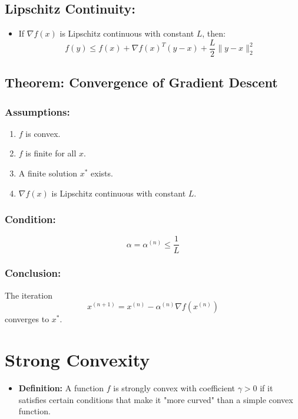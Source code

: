 \documentclass{article}
\begin{document}
\subsection*{Lipschitz Continuity:}
\begin{itemize}
    \item If $\nabla f(x)$ is Lipschitz continuous with constant $L$, then:
    \[
    f(y) \leq f(x) + \nabla f(x)^{T}(y - x) + \frac{L}{2}\|y - x\|^{2}_{2}
    \]
\end{itemize}

\subsection*{Theorem: Convergence of Gradient Descent}

\subsubsection*{Assumptions:}
\begin{enumerate}
    \item $f$ is convex.
    \item $f$ is finite for all $x$.
    \item A finite solution $x^{*}$ exists.
    \item $\nabla f(x)$ is Lipschitz continuous with constant $L$.
\end{enumerate}

\subsubsection*{Condition:}
\[
\alpha = \alpha^{(n)} \leq \frac{1}{L}
\]

\subsubsection*{Conclusion:} 
The iteration
\[
x^{(n+1)} = x^{(n)} - \alpha^{(n)} \nabla f(x^{(n)})
\]
converges to $x^{*}$.


\section*{Strong Convexity}
\begin{itemize}
    \item \textbf{Definition:} A function $f$ is strongly convex with coefficient $\gamma > 0$ if it satisfies certain conditions that make it "more curved" than a simple convex function.
\end{itemize}
\end{document}
